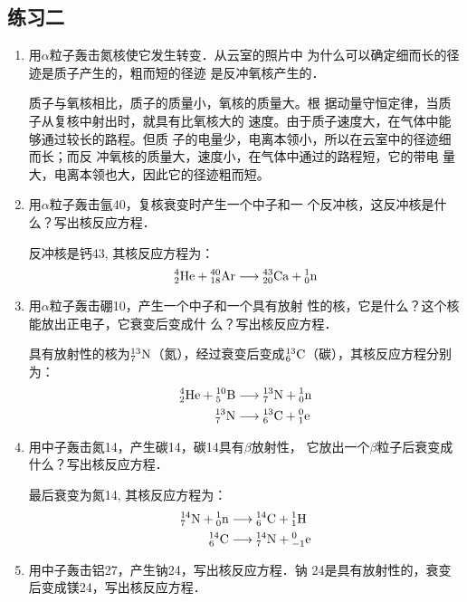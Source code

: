 \subsection{练习二}

\begin{enumerate}
    \item 用$\alpha$粒子轰击氮核使它发生转变．从云室的照片中
    为什么可以确定细而长的径迹是质子产生的，粗而短的径迹
    是反冲氧核产生的．


    \begin{solution}
    质子与氧核相比，质子的质量小，氧核的质量大。根
据动量守恒定律，当质子从复核中射出时，就具有比氧核大的
速度。由于质子速度大，在气体中能够通过较长的路程。但质
子的电量少，电离本领小，所以在云室中的径迹细而长；而反
冲氧核的质量大，速度小，在气体中通过的路程短，它的带电
量大，电离本领也大，因此它的径迹粗而短。
    \end{solution}
    \item 用$\alpha$粒子轰击氩40，复核衰变时产生一个中子和一
    个反冲核，这反冲核是什么？写出核反应方程．


    \begin{solution}
        反冲核是钙43, 其核反应方程为：
    \[\atom{He}{4}{2}+\atom{Ar}{40}{18}\longrightarrow \atom{Ca}{43}{20}+\atom{n}{1}{0}\]
    \end{solution}
    \item 用$\alpha$粒子轰击硼10，产生一个中子和一个具有放射
    性的核，它是什么？这个核能放出正电子，它衰变后变成什
    么？写出核反应方程．


    \begin{solution}
        具有放射性的核为$\atom{N}{13}{7}$（氮），经过衰变后变成$\atom{C}{13}{6}$（碳），其核反应方程分别为：
\[\begin{split}
    \atom{He}{4}{2}+\atom{B}{10}{5}&\longrightarrow \atom{N}{13}{7}+\atom{n}{1}{0}\\
    \atom{N}{13}{7} &\longrightarrow \atom{C}{13}{6}+\atom{e}{0}{1}
\end{split}\]
    \end{solution}
    \item 用中子轰击氮14，产生碳14，碳14具有$\beta$放射性，
    它放出一个$\beta$粒子后衰变成什么？写出核反应方程．


    \begin{solution}
        最后衰变为氮14, 其核反应方程为：
\[\begin{split}
    \atom{N}{14}{7}+\atom{n}{1}{0}&\longrightarrow \atom{C}{14}{6}+\atom{H}{1}{1}\\
    \atom{C}{14}{6} &\longrightarrow \atom{N}{14}{7}+\atom{e}{0}{-1}
\end{split}\]    
    \end{solution}
    \item 用中子轰击铝27，产生钠24，写出核反应方程．钠
    24是具有放射性的，衰变后变成镁24，写出核反应方程．



\end{enumerate}
